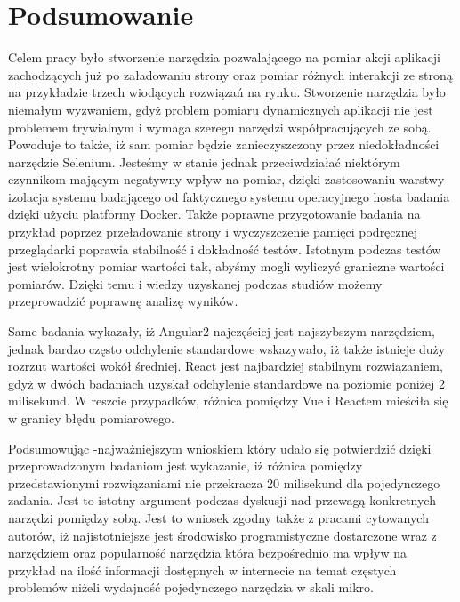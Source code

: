 \chapter{Podsumowanie}

Celem pracy było stworzenie narzędzia pozwalającego na pomiar akcji aplikacji \linebreak zachodzących już po załadowaniu strony oraz pomiar różnych interakcji ze stroną na przykładzie trzech wiodących rozwiązań na rynku.
Stworzenie narzędzia było niemałym wyzwaniem, gdyż problem pomiaru dynamicznych aplikacji nie jest problemem trywialnym i wymaga szeregu narzędzi
współpracujących ze sobą.
Powoduje to także, iż sam pomiar będzie zanieczyszczony przez niedokładności narzędzie Selenium.
Jesteśmy w stanie jednak przeciwdziałać niektórym czynnikom mającym negatywny wpływ na pomiar, dzięki zastosowaniu warstwy izolacja systemu badającego od faktycznego systemu operacyjnego hosta badania dzięki użyciu platformy Docker.
Także poprawne przygotowanie badania na przykład poprzez przeładowanie strony i wyczyszczenie pamięci podręcznej przeglądarki poprawia stabilność i dokładność testów.
Istotnym podczas testów jest wielokrotny pomiar wartości tak, abyśmy mogli wyliczyć graniczne wartości pomiarów. Dzięki temu i wiedzy uzyskanej podczas studiów możemy przeprowadzić poprawnę analizę wyników.

Same badania wykazały, iż Angular2 najczęściej jest najszybszym narzędziem, jednak bardzo często odchylenie standardowe wskazywało, iż także istnieje duży rozrzut wartości wokół średniej.
React jest najbardziej stabilnym rozwiązaniem, gdyż w dwóch badaniach uzyskał odchylenie standardowe na poziomie poniżej 2 milisekund. W reszcie przypadków, różnica pomiędzy Vue i Reactem mieściła się w granicy błędu pomiarowego.

Podsumowując -najważniejszym wnioskiem który udało się potwierdzić dzięki przeprowadzonym badaniom jest wykazanie, iż różnica pomiędzy przedstawionymi rozwiązaniami nie przekracza 20 milisekund dla pojedynczego zadania.
Jest to istotny argument podczas dyskusji nad przewagą konkretnych narzędzi pomiędzy sobą.
Jest to wniosek zgodny także z pracami cytowanych autorów, iż najistotniejsze jest środowisko programistyczne dostarczone wraz z narzędziem oraz popularność narzędzia która bezpośrednio ma wpływ na przykład
na ilość informacji dostępnych w internecie na temat częstych problemów niżeli wydajność pojedynczego narzędzia w skali mikro.


\let\cleardoublepage\clearpage